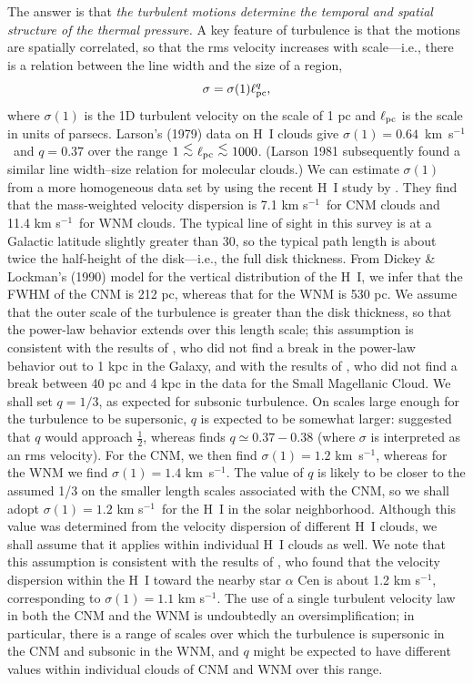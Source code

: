 \documentclass[12pt,preprint,flushrt]{aastex}
\newcommand{\beq}{\begin{equation}}
\newcommand{\eeq}{\end{equation}}
\newcommand{\e}{$^{-1}$}
\newcommand{\ellpc}{\ell_{\rm pc}}
\newcommand{\al}{\mbox{ \raisebox{-.4ex}{$\stackrel{\textstyle <}{\sim}$} }}
\begin{document}
        The answer is that {\it the turbulent motions
determine the temporal and spatial structure of the
thermal pressure.}  A key feature of turbulence is that
the motions are spatially correlated, so that
the rms velocity increases with scale---i.e., there
is a relation between the line width and the size of
a region,
\beq
\sigma=\sigma(1)\ellpc^q,
\eeq
where $\sigma(1)$ is the 1D turbulent velocity on
the scale of 1 pc and $\ellpc$ is the scale in units of parsecs.
Larson's (1979) data on H~I clouds give
$\sigma(1)=0.64$~km~s\e\ and $q=0.37$
over the range $1\al\ellpc\al 1000$.
(Larson 1981 subsequently found a similar
line width--size relation for molecular clouds.)
We can estimate $\sigma(1)$ from a more homogeneous data
set by using the recent H~I study by \cite{hei02}.
They find that the mass-weighted velocity dispersion is
7.1 km s\e\ for CNM clouds and 11.4 km s\e\ for WNM clouds.
The typical line of sight in this survey is at a Galactic
latitude slightly greater than 30\arcdeg, so the typical
path length is about twice the half-height of the disk---i.e.,
the full disk thickness.  From Dickey \& Lockman's (1990)
model for the vertical distribution of the H~I,
we infer that the FWHM of the CNM is 212 pc,
whereas that for the WNM is 530 pc.
We assume that the outer scale of the turbulence is greater
than the disk thickness, so that the power-law behavior
extends over this length scale; this assumption is consistent with
the results of \cite{lar79}, who did not find a break
in the power-law behavior out to 1 kpc in the Galaxy,
and with the results of \cite{laz00},
who did not find a break between 40 pc and 4 kpc in the data
for the Small Magellanic Cloud.
We shall set
$q=1/3$, as expected for subsonic
turbulence. On
scales large enough for the turbulence to be supersonic,
$q$ is expected 
to be somewhat larger: \cite{lar79} suggested that
$q$ would approach $\frac 12$, whereas \cite{bold02}
finds $q\simeq 0.37-0.38$ (where $\sigma$ is interpreted
as an rms velocity).
For the CNM, we then find $\sigma(1)=1.2$ km~s\e,
whereas for the WNM we find $\sigma(1)=1.4$ km~s\e.
The value of $q$ is likely to be closer to the assumed
1/3 on the smaller length scales associated with the CNM,
so we shall adopt $\sigma(1)=1.2$ km s\e\ for the H~I
in the solar neighborhood.  Although this value was
determined from the velocity dispersion of different H~I clouds, 
we shall assume that it applies within individual
H~I clouds as well.
We note that this 
assumption is consistent with
the results of \cite{lin96}, who found that the velocity
dispersion within the H~I toward 
the nearby star $\alpha$ Cen is about 1.2 km s\e,
corresponding to $\sigma(1)=1.1$ km s\e.
The use of a single turbulent velocity law in both
the CNM and the WNM is 
undoubtedly an oversimplification; in particular,
there is a range of scales over which the turbulence
is supersonic in the CNM and subsonic in the WNM, and
$q$ might be expected to have different values within
individual clouds of CNM and WNM over this range.
\end{document}
